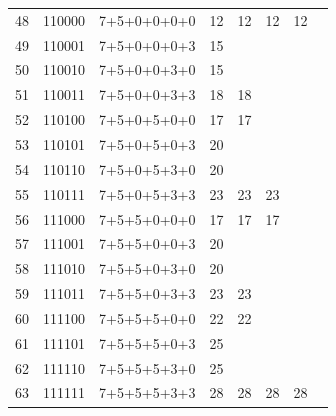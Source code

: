 \documentclass[12pt]{extarticle}
\begin{document}
 \begin{center}
\begin{tabular}{ | m{1.5cm} | m{1.7cm} | m{3cm} | m{1.2cm} | m{1.3cm} | m{1.3cm} | m{1.5cm} | m{1.5cm} |}
\cline{1-7}
 48 & 110000 & 7+5+0+0+0+0 & 12 &                     12 & 12                 & 12                 &\\
 \cline{1-4}
 49 & 110001 & 7+5+0+0+0+3 & 15 & \multirow{2}{*}{ }     & \multirow{6}{*}{ } & \multirow{14}{*}{} & \multirow{30}{*}{}\\
 \cline{1-4}
 50 & 110010 & 7+5+0+0+3+0 & 15 &                        &                    &                    &\\
 \cline{1-4}
 51 & 110011 & 7+5+0+0+3+3 & 18 &                     18 &                    &                    &\\
 \cline{1-5}
 52 & 110100 & 7+5+0+5+0+0 & 17 &                     17 &                    &                    &\\
 \cline{1-4}
 53 & 110101 & 7+5+0+5+0+3 & 20 & \multirow{2}{*}{ }     &                    &                    &\\
 \cline{1-4}
 54 & 110110 & 7+5+0+5+3+0 & 20 &                        &                    &                    &\\
 \cline{1-4}
 55 & 110111 & 7+5+0+5+3+3 & 23 &                     23 & 23                 &                    &\\
 \cline{1-6}

 56 & 111000 & 7+5+5+0+0+0 & 17 &                     17 & 17                 &                    &\\
 \cline{1-4}
 57 & 111001 & 7+5+5+0+0+3 & 20 & \multirow{2}{*}{ }     & \multirow{6}{*}{ } &                    &\\
 \cline{1-4}
 58 & 111010 & 7+5+5+0+3+0 & 20 &                        &                    &                    &\\
 \cline{1-4}
 59 & 111011 & 7+5+5+0+3+3 & 23 &                     23 &                    &                    &\\
 \cline{1-5}
 60 & 111100 & 7+5+5+5+0+0 & 22 &                     22 &                    &                    &\\
 \cline{1-4}
 61 & 111101 & 7+5+5+5+0+3 & 25 & \multirow{2}{*}{ }     &                    &                    &\\
 \cline{1-4}
 62 & 111110 & 7+5+5+5+3+0 & 25 &                        &                    &                    &\\
 \cline{1-4}
 63 & 111111 & 7+5+5+5+3+3 & 28 &                     28 & 28                 & 28                 & 28\\
 \cline{1-8}
 \end{tabular}
 \end{center}
\end{document}
